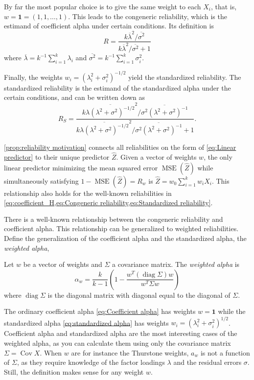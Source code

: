 \documentclass[twoside]{article}
\DeclareMathOperator{\Cov}{Cov}
\DeclareMathOperator{\diag}{diag}
\DeclareMathOperator{\MSE}{MSE}
\renewcommand{\sqrt}[1]{{(#1)^{1/2}}}
\begin{document}
By far the most popular choice is to give the same weight to each $X_i$, that is, $w = \boldsymbol{1}=(1,1,\ldots,1)$. This leads to the congeneric reliability, which is the estimand of coefficient alpha under certain conditions. Its definition is
\begin{equation}
 R =\frac{k\overline{\lambda}^{2}/\overline{\sigma^{2}}}{k\overline{\lambda}^{2}/\overline{\sigma^{2}} + 1}\label{eq:Congeneric reliability}
\end{equation}
where $\overline{\lambda}=k^{-1}\sum_{i=1}^{k}\lambda_{i}$ and
$\overline{\sigma^{2}}=k^{-1}\sum_{i=1}^{k}\sigma_{i}^{2}$. 

Finally, the weights $w_i = (\lambda_i^2 + \sigma_i^2)^{-1/2}$ yield the standardized reliability. The standardized reliability is the estimand of the standardized alpha under the certain conditions, and can be written down as
\begin{equation}
 R_S=\frac{k\overline{\lambda(\lambda^{2}+\sigma^{2})^{-1/2}}^{2}/\overline{\sigma^{2}(\lambda^{2}+\sigma^{2})^{-1}}}{k\overline{\lambda(\lambda^{2}+\sigma^{2})^{-1/2}}^{2}/\overline{\sigma^{2}(\lambda^{2}+\sigma^{2})^{-1}}+1}.\label{eq:Standardized reliability}
\end{equation}

\cref{prop:reliability motivation} connects all reliabilities on the form of \cref{eq:Linear predictor} to their unique predictor $\hat{Z}$. Given a vector of weights $w$, the only linear predictor minimizing the mean squared error $\MSE(\hat{Z})$ while simultaneously satisfying $1-\MSE(\hat{Z})=R_w$ is $\hat{Z}=w_0\sum_{i=1}^k w_iX_i$. This relationship also holds for the well-known reliabilities in \cref{eq:coefficient_H,eq:Congeneric reliability,eq:Standardized reliability}.

There is a well-known relationship between the congeneric reliability and coefficient alpha. This relationship can be generalized to weighted reliabilities. Define the generalization of the coefficient alpha and the standardized alpha, the \textit{weighted alpha},

\begin{defn}
Let $w$ be a vector of weights and $\Sigma$ a covariance matrix. The \textit{weighted alpha} is
\begin{equation}
\alpha_{w}=\frac{k}{k-1}\left(1-\frac{w^{T}(\diag\Sigma)w}{w^{T}\Sigma w}\right)\label{eq:weighted alpha}
\end{equation}
where $\diag\Sigma$ is the diagonal matrix with diagonal equal to the diagonal of $\Sigma$.
\end{defn}
The ordinary coefficient alpha \eqref{eq:Coefficient alpha} has weights $w=\boldsymbol{1}$
while the standardized alpha \eqref{eq:standardized alpha} has weights $w_{i}=\sqrt{\lambda_{i}^{2}+\sigma_{i}^{2}}$. Coefficient alpha and standardized alpha are the most interesting cases of the weighted alpha, as you can calculate them using only the covariance matrix $\Sigma = \Cov X$. When $w$ are for instance the Thurstone weights, $a_w$ is not a function of $\Sigma$, as they require knowledge of the factor loadings $\lambda$ and the residual errors $\sigma$. Still, the definition makes sense for any weight $w$. 
\end{document}

